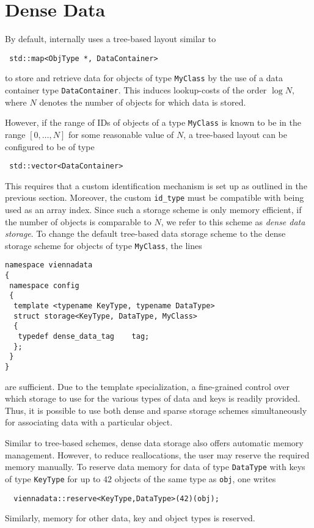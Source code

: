 \section{Dense Data} \label{sec:dense-data}
By default, {\ViennaData} internally uses a tree-based layout similar to
\begin{lstlisting}
 std::map<ObjType *, DataContainer>
\end{lstlisting}
to store and retrieve data for objects of type \lstinline|MyClass| by the use of a data container type \lstinline|DataContainer|.
This induces lookup-costs of the order $\log N$, where $N$ denotes the number of objects for which data is stored.

However, if the range of IDs of objects of a type \lstinline|MyClass| is known to be in the range $[0, \ldots, N]$ for some reasonable value of $N$,
a tree-based layout can be configured to be of type
\begin{lstlisting}
 std::vector<DataContainer>
\end{lstlisting}
This requires that a custom identification mechanism is set up as outlined in the previous section. Moreover, the 
custom \lstinline|id_type| must be compatible with being used as an array index. Since such a storage scheme is only memory efficient,
if the number of objects is comparable to $N$, we refer to this scheme as \emph{dense data storage}.
To change the default tree-based data storage scheme to the dense storage scheme for objects of type \lstinline|MyClass|, the lines
\begin{lstlisting}
namespace viennadata
{
 namespace config
 {
  template <typename KeyType, typename DataType>
  struct storage<KeyType, DataType, MyClass>
  {
   typedef dense_data_tag    tag;
  };
 }
}
\end{lstlisting}
are sufficient. Due to the template specialization, a fine-grained control over which storage to use for the various types of data and keys is readily provided. Thus, it is possible to use both dense and sparse storage schemes simultaneously for associating data with a particular object.

Similar to tree-based schemes, dense data storage also offers automatic memory management. However, to reduce reallocations,
the user may reserve the required memory manually.
To reserve data memory for data of type \lstinline|DataType| with keys of type \lstinline|KeyType| for up to $42$ objects of the same type as \lstinline|obj|,
one writes
\begin{lstlisting}
  viennadata::reserve<KeyType,DataType>(42)(obj);
\end{lstlisting}
Similarly, memory for other data, key and object types is reserved.



